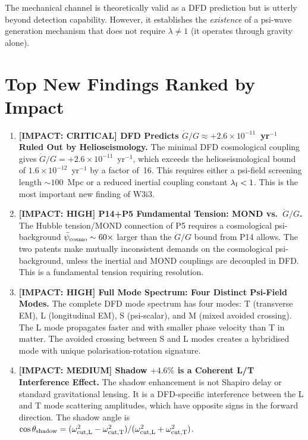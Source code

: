 \documentclass[11pt]{article}
\newcommand{\ee}[1]{\times 10^{#1}}
\newcommand{\psibar}{\bar{\psi}}
\newcommand{\lambdaI}{\lambda_{\rm I}}
\begin{document}
The mechanical channel is theoretically valid as a DFD prediction but
is utterly beyond detection capability. However, it establishes the
\emph{existence} of a psi-wave generation mechanism that does not require
$\lambda \neq 1$ (it operates through gravity alone).

\section{Top New Findings Ranked by Impact}
\label{sec:top-findings}

\begin{enumerate}[leftmargin=*]

\item \textbf{[IMPACT: CRITICAL] DFD Predicts $\dot{G}/G \approx +2.6\ee{-11}$~yr$^{-1}$
  Ruled Out by Helioseismology.}
  The minimal DFD cosmological coupling gives $\dot{G}/G = +2.6\ee{-11}$~yr$^{-1}$,
  which exceeds the helioseismological bound of $1.6\ee{-12}$~yr$^{-1}$ by a factor
  of~16. This requires either a psi-field screening length $\sim 100$~Mpc or a
  reduced inertial coupling constant $\lambdaI < 1$. This is the most important
  new finding of W3i3.

\item \textbf{[IMPACT: HIGH] P14+P5 Fundamental Tension: MOND vs.\ $\dot{G}/G$.}
  The Hubble tension/MOND connection of P5 requires a cosmological psi-background
  $\psibar_{\rm cosmo} \sim 60\times$ larger than the $\dot{G}/G$ bound from P14
  allows. The two patents make mutually inconsistent demands on the cosmological
  psi-background, unless the inertial and MOND couplings are decoupled in DFD.
  This is a fundamental tension requiring resolution.

\item \textbf{[IMPACT: HIGH] Full Mode Spectrum: Four Distinct Psi-Field Modes.}
  The complete DFD mode spectrum has four modes: T (transverse EM), L (longitudinal
  EM), S (psi-scalar), and M (mixed avoided crossing). The L mode propagates faster
  and with smaller phase velocity than T in matter. The avoided crossing between
  S and L modes creates a hybridised mode with unique polarisation-rotation signature.

\item \textbf{[IMPACT: MEDIUM] Shadow $+4.6\%$ is a Coherent L/T Interference Effect.}
  The shadow enhancement is not Shapiro delay or standard gravitational lensing.
  It is a DFD-specific interference between the L and T mode scattering amplitudes,
  which have opposite signs in the forward direction. The shadow angle is
  $\cos\theta_{\rm shadow} = (\omega_{\rm cut,L}^2 - \omega_{\rm cut,T}^2)/
  (\omega_{\rm cut,L}^2 + \omega_{\rm cut,T}^2)$.


\end{enumerate}
\end{document}
